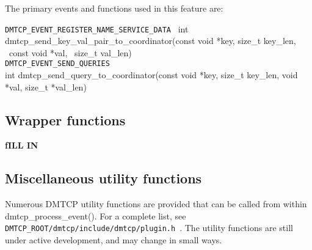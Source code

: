 \documentclass{article}
\begin{document}
The primary events and functions used in this feature are:

\noindent
{\tt DMTCP\_EVENT\_REGISTER\_NAME\_SERVICE\_DATA} \
int dmtcp\_send\_key\_val\_pair\_to\_coordinator(const void *key,
                                                   size\_t key\_len, \
                                                   const void *val, \
                                                   size\_t val\_len) \\
{\tt DMTCP\_EVENT\_SEND\_QUERIES} \\
int dmtcp\_send\_query\_to\_coordinator(const void *key, size\_t key\_len,
                                            void *val, size\_t *val\_len)

\subsection{Wrapper functions}

{\bf fILL IN}

\subsection{Miscellaneous utility functions}

Numerous DMTCP utility functions are provided that can be called from within
dmtcp\_process\_event().  For a complete list, see
{\tt DMTCP\_ROOT/dmtcp/include/dmtcp/plugin.h}~.
The utility functions are still under active development, and may change
in small ways.
\end{document}
